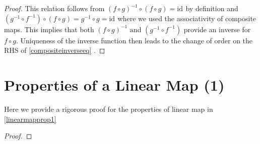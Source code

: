 \documentclass[a4paper,12pt]{report}
\begin{document}
\begin{appendices}
\begin{proof}
    This relation follows from \((f \circ g)^{-1} \circ (f \circ g) = \mathrm{id}_{}  \) by definition and \((g^{-1} \circ f^{-1} )\circ (f \circ g)= g^{-1} \circ g = \mathrm{id}_{} \) where we used the associativity of composite maps. This implies that both \((f \circ  g)^{-1} \text { and } (g^{-1} \circ f^{-1} )\) provide an inverse for \(f \circ  g\). Uniqueness of the inverse function then leads to the change of order on the RHS of \cref{compositeinverseeq} .
\end{proof}

\section{Properties of a Linear Map (1)} \label{linearmapprop1app}

Here we provide a rigorous proof for the properties of linear map in \cref{linearmapprop1}

\begin{proof}


\end{proof}
\end{appendices}
\end{document}
